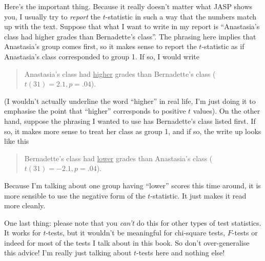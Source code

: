 Here's the important thing. Because it really doesn't matter what JASP shows you, I usually try to {\it report} the $t$-statistic in such a way that the numbers match up with the text. Suppose that what I want to write in my report is ``Anastasia's class had higher grades than Bernadette's class''. The phrasing here implies that Anastasia's group comes first, so it makes sense to report the $t$-statistic as if Anastasia's class corresponded to group 1. If so, I would write 
\begin{quote}
Anastasia's class had \underline{higher} grades than Bernadette's class ($t(31)= 2.1, p=.04$). 
\end{quote}
(I wouldn't actually underline the word ``higher'' in real life, I'm just doing it to emphasise the point that ``higher'' corresponds to positive $t$ values). On the other hand, suppose the phrasing I wanted to use has Bernadette's class listed first. If so, it makes more sense to treat her class as group 1, and if so, the write up looks like this
\begin{quote}
Bernadette's class had \underline{lower} grades than Anastasia's class ($t(31)= -2.1, p=.04$). 
\end{quote}
Because I'm talking about one group having ``lower'' scores this time around, it is more sensible to use the negative form of the $t$-statistic. It just makes it read more cleanly.

One last thing: please note that you {\it can't} do this for other types of test statistics. It works for $t$-tests, but it wouldn't be meaningful for chi-square tests, $F$-tests or indeed for most of the tests I talk about in this book. So don't over-generalise this advice! I'm really just talking about $t$-tests here and nothing else!
 

